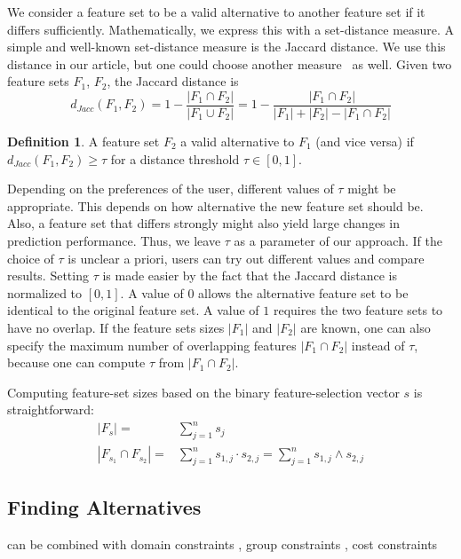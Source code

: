 \documentclass{article}
\theoremstyle{definition}
\newtheorem{definition}{Definition}
\begin{document}
We consider a feature set to be a valid alternative to another feature set if it differs sufficiently.
Mathematically, we express this with a set-distance measure.
A simple and well-known set-distance measure is the Jaccard distance.
We use this distance in our article, but one could choose another measure~\cite{egghe2009new} as well.
Given two feature sets $F_1$, $F_2$, the Jaccard distance is
%
\begin{equation}
	d_{Jacc}(F_1,F_2) = 1 - \frac{|F_1 \cap F_2|}{|F_1 \cup F_2|} = 1 - \frac{|F_1 \cap F_2|}{|F_1| + |F_2| - |F_1 \cap F_2|}
\end{equation}
%
\begin{definition}
	A feature set $F_2$ a valid alternative to $F_1$ (and vice versa) if $d_{Jacc}(F_1,F_2) \geq \tau$ for a distance threshold $\tau \in [0,1]$.
\end{definition}
%
Depending on the preferences of the user, different values of $\tau$ might be appropriate.
This depends on how alternative the new feature set should be.
Also, a feature set that differs strongly might also yield large changes in prediction performance.
Thus, we leave $\tau$ as a parameter of our approach.
If the choice of $\tau$ is unclear a priori, users can try out different values and compare results.
Setting $\tau$ is made easier by the fact that the Jaccard distance is normalized to $[0,1]$.
A value of $0$ allows the alternative feature set to be identical to the original feature set.
A value of $1$ requires the two feature sets to have no overlap.
If the feature sets sizes $|F_1|$ and $|F_2|$ are known, one can also specify the maximum number of overlapping features $|F_1 \cap F_2|$ instead of $\tau$, because one can compute $\tau$ from $|F_1 \cap F_2|$.

Computing feature-set sizes based on the binary feature-selection vector $s$ is straightforward:
%
\begin{align}
	|F_s| =& \sum_{j=1}^n s_j\\
	|F_{s_1} \cap F_{s_2}| =& \sum_{j=1}^n s_{1,j} \cdot s_{2,j} = \sum_{j=1}^n s_{1,j} \land s_{2,j}
\end{align}
%
\subsection{Finding Alternatives}

can be combined with domain constraints \cite{groves2015toward}, group constraints \cite{yuan2006model}, cost constraints \cite{paclik2002feature}
\end{document}

